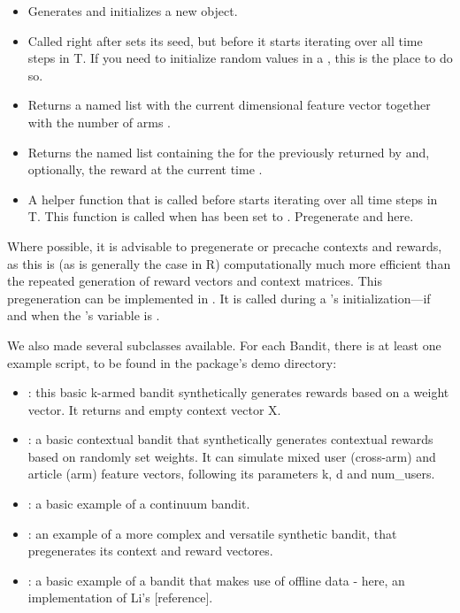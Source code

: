 \documentclass[nojss]{jss}\usepackage[]{graphicx}\usepackage[]{color}
\begin{document}
\begin{itemize}
  \item{}{ Generates and initializes a new  object. }
  \item{}{
     Called right after  sets its seed,
     but before it starts iterating over all time steps  in T. If you need to initialize random values in a ,
     this is the place to do so.
  }
  \item{}{
     Returns a named list 
     with the current  dimensional  feature vector  together with the number of arms .
 }
  \item{}{
     Returns the named list  containing the 
     for the  previously returned by  and,
     optionally, the  reward
     at the current time .
 }
  \item{}{
     A helper function that is called before  starts iterating over all time steps  in T.
     This function is called when  has been set to .
     Pregenerate  and  here.
  }
\end{itemize}

Where possible, it is advisable to pregenerate or precache  contexts and rewards, as this is (as is generally the case in R) computationally much more efficient than the repeated generation of reward vectors and context matrices. This pregeneration can be implemented in . It is called during a 's initialization---if and when the 's  variable is .

We also made several  subclasses available. For each Bandit, there is at least one example script, to be found in the package’s demo directory:

\begin{itemize}
         \item {}: this basic k-armed bandit synthetically generates rewards based on a weight vector. It returns and empty context vector X.
         \item {}: a basic contextual bandit that synthetically generates contextual rewards based on randomly set weights. It can simulate mixed user (cross-arm) and article (arm) feature vectors, following its parameters k, d and num\_users.
         \item {}: a basic example of a continuum bandit.
         \item {}: an example of a more complex and versatile synthetic bandit, that pregenerates its context and reward vectores.
         \item {}: a basic example of a bandit that makes use of offline data - here, an implementation of Li's [reference].
\end{itemize}
\end{document}

